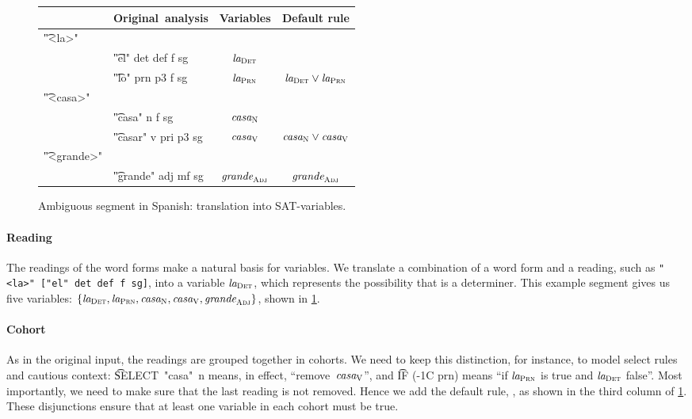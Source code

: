 \begin{figure}[h]
\centering
\begin{tabular}{p{0.6cm} l | c | c }
   & \textbf{Original~analysis} 
                & \textbf{Variables}
                              & \textbf{Default rule} \\ \hline
\t{"<la>"}   &   &            &  {\small {}} \\
  & \t{"el" 
  det def f sg}  & $\text{\em la}_{\text{\sc Det}}$   &  \\
  & \t{"lo" 
  prn p3 f sg}   & $\text{\em la}_{\text{\sc Prn}}$   &   $\text{\em la}_{\text{\sc Det}} \vee \text{\em la}_{\text{\sc Prn}}$ \\
\t{"<casa>"} &   &            &   \\
  & \t{"casa" 
  n f sg}        & $\text{\em casa}_{\text{\sc N}}$   &  \\
  & \t{"casar"
   v pri p3 sg}  & $\text{\em casa}_{\text{\sc V}}$   & $\text{\em casa}_{\text{\sc N}} \vee \text{\em casa}_{\text{\sc V}}$  \\
\t{"<grande>"} & &            & \\
  & \t{"grande" 
  adj mf sg}   & $\text{\em grande}_{\text{\sc Adj}}$ & $\text{\em grande}_{\text{\sc Adj}}$
\end{tabular}
\caption{Ambiguous segment in Spanish: translation into SAT-variables.}
\label{fig:laCasaGrande}
\end{figure}


\paragraph{Reading}
The readings of the word forms make a natural basis for variables.
We translate a combination of a word form and a reading, such as \texttt{"<la>" ["el" det def f sg]}, into a variable $\text{\em la}_{\text{\sc Det}}$, which represents the possibility that \la{} is a determiner. This example segment gives us five variables: $\{ \text{\em la}_{\text{\sc Det}} , \text{\em la}_{\text{\sc Prn}} , \text{\em casa}_{\text{\sc N}} , \text{\em casa}_{\text{\sc V}},  \text{\em grande}_{\text{\sc Adj}} \}$, shown in \ref{fig:laCasaGrande}.

\paragraph{Cohort} As in the original input, the readings are grouped together in cohorts. We need to keep this distinction, for instance, to model {\sc select} rules and cautious context: 
\t{SELECT~"casa"~n} means, in effect, ``remove~$\text{\em casa}_{\text{\sc V}}$'', and \t{IF (-1C prn)} means ``if $\text{\em la}_{\text{\sc Prn}}$ is true and $\text{\em la}_{\text{\sc Det}}$ false''. 
%
Most importantly, we need to make sure that the last reading is not removed. Hence we add the default rule, , as shown in the third column of \ref{fig:laCasaGrande}. 
These disjunctions ensure that at least one variable in each cohort must be true.

